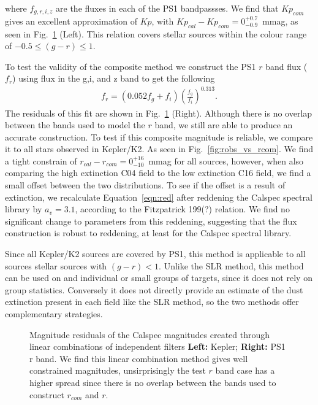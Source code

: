 \documentclass{aastex63}
\begin{document}
where $f_{g,r,i,z}$ are the fluxes in each of the PS1 bandpassses. We find that $Kp_{com}$ gives an excellent approximation of $Kp$, with $Kp_{cal}-Kp_{com} = 0^{+0.7}_{-0.9}$~mmag, as seen in Fig.~\ref{fig:com_residuals} (Left). This relation covers stellar sources within the colour range of $-0.5\leq (g-r)\leq 1$. 

To test the validity of the composite method we construct the PS1 $r$ band flux ($f_r$) using flux in the g,i, and z band to get the following
\begin{eqnarray}
f_r = \left(0.052f_g + f_i\right)\left(\frac{f_g}{f_i} \right)^{0.313}.
\label{eqn:red}
\end{eqnarray}
The residuals of this fit are shown in Fig.~\ref{fig:com_residuals} (Right). Although there is no overlap between the bands used to model the $r$ band, we still are able to produce an accurate construction. To test if this composite magnitude is reliable, we compare it to all stars observed in Kepler/K2. As seen in Fig.~\ref{fig:robs_vs_rcom}. We find a tight constrain of $r_{cal}-r_{com} = 0^{+16}_{-10}$~mmag for all sources, however, when also comparing the high extinction C04 field to the low extinction C16 field, we find a small offset between the two distributions. To see if the offset is a result of extinction, we recalculate Equation~\ref{eqn:red} after reddening the Calspec spectral library by $a_v=3.1$, according to the Fitzpatrick 199(?) relation. We find no significant change to parameters from this reddening, suggesting that the flux construction is robust to reddening, at least for the Calspec spectral library.

Since all Kepler/K2 sources are covered by PS1, this method is applicable to all sources stellar sources with $(g-r)<1$. Unlike the SLR method, this method can be used on and individual or small groups of targets, since it does not rely on group statistics. Conversely it does not directly provide an estimate of the dust extinction present in each field like the SLR method, so the two methods offer complementary strategies.



\begin{figure}
\caption{Magnitude residuals of the Calspec magnitudes created through linear combinations of independent filters \textbf{Left:} Kepler; \textbf{Right:} PS1 r band. We find this linear combination method gives well constrained magnitudes, unsirprisingly the test $r$ band case has a higher spread since there is no overlap between the bands used to construct $r_{com}$ and $r$. \label{fig:com_residuals}}
\end{figure}
\end{document}
